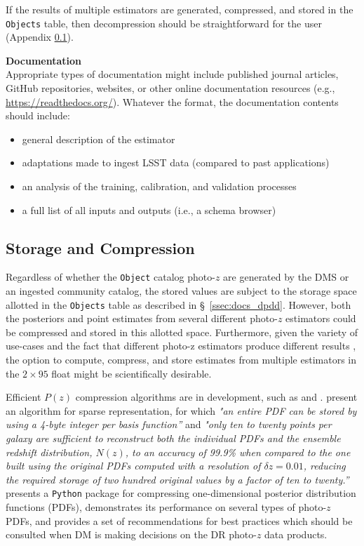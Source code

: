 \documentclass[DM,lsstdraft,toc]{lsstdoc}
\begin{document}
If the results of multiple estimators are generated, compressed, and stored in the {\tt Objects} table, then decompression should be straightforward for the user (Appendix \ref{ssec:dp_store}).

{\bf Documentation}\\
Appropriate types of documentation might include published journal articles, GitHub repositories, websites, or other online documentation resources (e.g., \url{https://readthedocs.org/}). Whatever the format, the documentation contents should include: 
\vspace{-15pt}
\begin{itemize}
\item general description of the estimator
\item adaptations made to ingest LSST data (compared to past applications)
\item an analysis of the training, calibration, and validation processes
\item a full list of all inputs and outputs (i.e., a schema browser)
\end{itemize}

\subsection{Storage and Compression}\label{ssec:dp_store}

Regardless of whether the {\tt Object} catalog photo-$z$ are generated by the DMS or an ingested community catalog, the stored values are subject to the storage space allotted in the {\tt Objects} table as described in \S~\ref{ssec:docs_dpdd}.
However, both the posteriors and point estimates from several different photo-$z$ estimators could be compressed and stored in this allotted space.
Furthermore, given the variety of use-cases and the fact that different photo-z estimators produce different results \citep{2020arXiv200103621S}, the option to compute, compress, and store estimates from multiple estimators in the $2\times95$ float might be scientifically desirable.

Efficient $P(z)$ compression algorithms are in development, such as \citet{2014MNRAS.441.3550C} and \citet{2018AJ....156...35M}.
\citet{2014MNRAS.441.3550C} present an algorithm for sparse representation, for which {\it "an entire PDF can be stored by using a 4-byte integer per basis function''} and {\it "only ten to twenty points per galaxy are sufficient to reconstruct both the individual PDFs and the ensemble redshift distribution, $N(z)$, to an accuracy of 99.9\% when compared to the one built using the original PDFs computed with a resolution of $\delta z = 0.01$, reducing the required storage of two hundred original values by a factor of ten to twenty.''} 
\citet{2018AJ....156...35M} presents a {\tt Python} package for compressing one-dimensional posterior distribution functions (PDFs), demonstrates its performance on several types of photo-$z$ PDFs, and provides a set of recommendations for best practices which should be consulted when DM is making decisions on the DR photo-$z$ data products.
\end{document}
